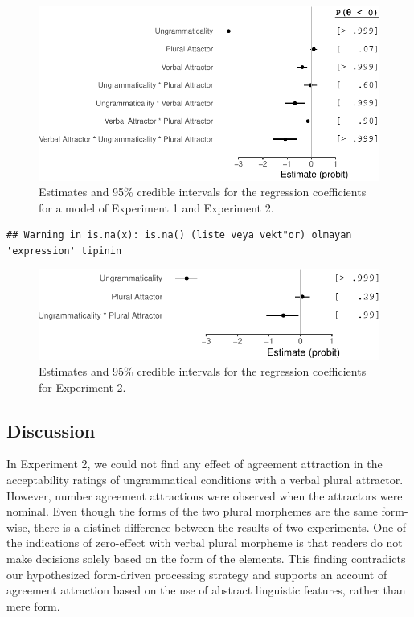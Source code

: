\documentclass[
  english,
  doc,floatsintext]{apa6}
\begin{document}
\begin{figure}
\centering
\includegraphics{ongoing_paper_files/figure-latex/exp2ResponseModel-1.pdf}
\caption{\label{fig:exp2ResponseModel}Estimates and 95\% credible intervals for the regression coefficients for a model of Experiment 1 and Experiment 2.}
\end{figure}

\begin{verbatim}
## Warning in is.na(x): is.na() (liste veya vekt"or) olmayan 'expression' tipinin
\end{verbatim}

\begin{figure}
\centering
\includegraphics{ongoing_paper_files/figure-latex/exp2ResponseModelExp2Only-1.pdf}
\caption{\label{fig:exp2ResponseModelExp2Only}Estimates and 95\% credible intervals for the regression coefficients for Experiment 2.}
\end{figure}

\hypertarget{discussion-1}{%
\subsection{Discussion}\label{discussion-1}}

In Experiment 2, we could not find any effect of agreement attraction in the acceptability ratings of ungrammatical conditions with a verbal plural attractor. However, number agreement attractions were observed when the attractors were nominal. Even though the forms of the two plural morphemes are the same form-wise, there is a distinct difference between the results of two experiments. One of the indications of zero-effect with verbal plural morpheme is that readers do not make decisions solely based on the form of the elements. This finding contradicts our hypothesized form-driven processing strategy and supports an account of agreement attraction based on the use of abstract linguistic features, rather than mere form.
\end{document}
